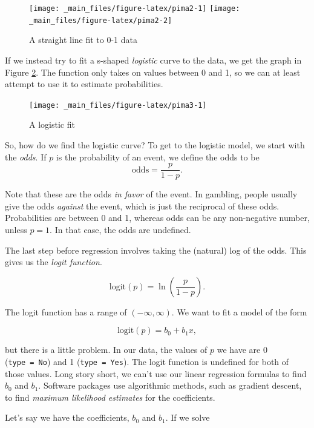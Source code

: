 \documentclass[
]{book}
\theoremstyle{definition}
\theoremstyle{definition}
\theoremstyle{definition}
\theoremstyle{definition}
\theoremstyle{remark}
\begin{document}
\begin{figure}
\texttt{[image: \_main\_files/figure-latex/pima2-1]} \texttt{[image: \_main\_files/figure-latex/pima2-2]} \caption{A straight line fit to 0-1 data}\label{fig:pima2}
\end{figure}

If we instead try to fit a s-shaped \emph{logistic} curve to the data, we get the graph in Figure \ref{fig:pima3}. The function only takes on values between 0 and 1, so we can at least attempt to use it to estimate probabilities.

\begin{figure}

{\centering \texttt{[image: \_main\_files/figure-latex/pima3-1]} 

}

\caption{A logistic fit}\label{fig:pima3}
\end{figure}

So, how do we find the logistic curve? To get to the logistic model, we start with the \emph{odds}. If \(p\) is the probability of an event, we define the odds to be
\[\text{odds}=\frac{p}{1-p}.\]

Note that these are the odds \emph{in favor} of the event. In gambling, people usually give the odds \emph{against} the event, which is just the reciprocal of these odds. Probabilities are between 0 and 1, whereas odds can be any non-negative number, unless \(p=1.\) In that case, the odds are undefined.

The last step before regression involves taking the (natural) log of the odds. This gives us the \emph{logit function}.

\[\text{logit}(p)=\ln\left(\frac{p}{1-p}\right).\]

The logit function has a range of \((-\infty,\infty).\) We want to fit a model of the form

\[\text{logit}(p)=b_0+b_1 x,\]

but there is a little problem. In our data, the values of \(p\) we have are 0 (\texttt{type\ =\ No}) and 1 (\texttt{type\ =\ Yes}). The logit function is undefined for both of those values. Long story short, we can't use our linear regression formulas to find \(b_0\) and \(b_1.\) Software packages use algorithmic methods, such as gradient descent, to find \emph{maximum likelihood estimates} for the coefficients.

Let's say we have the coefficients, \(b_0\) and \(b_1.\) If we solve
\end{document}
